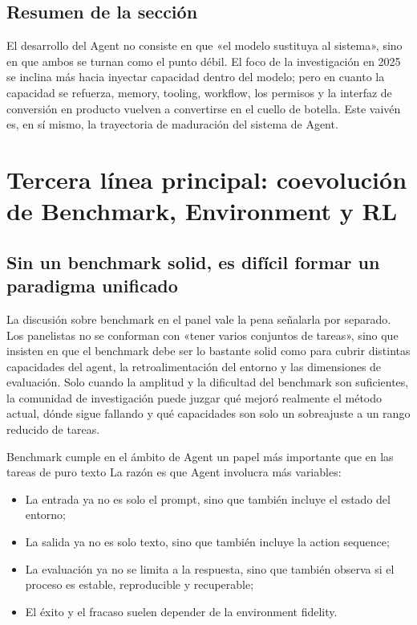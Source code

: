 \documentclass[a4paper]{article}
\begin{document}
\subsection{Resumen de la sección}
El desarrollo del Agent no consiste en que «el modelo sustituya al sistema», sino en que ambos se turnan como el punto débil. El foco de la investigación en 2025 se inclina más hacia inyectar capacidad dentro del modelo; pero en cuanto la capacidad se refuerza, memory, tooling, workflow, los permisos y la interfaz de conversión en producto vuelven a convertirse en el cuello de botella. Este vaivén es, en sí mismo, la trayectoria de maduración del sistema de Agent.

\section{Tercera línea principal: coevolución de Benchmark, Environment y RL}

\subsection{Sin un benchmark solid, es difícil formar un paradigma unificado}
La discusión sobre benchmark en el panel vale la pena señalarla por separado. Los panelistas no se conforman con «tener varios conjuntos de tareas», sino que insisten en que el benchmark debe ser lo bastante solid como para cubrir distintas capacidades del agent, la retroalimentación del entorno y las dimensiones de evaluación. Solo cuando la amplitud y la dificultad del benchmark son suficientes, la comunidad de investigación puede juzgar qué mejoró realmente el método actual, dónde sigue fallando y qué capacidades son solo un sobreajuste a un rango reducido de tareas.

\begin{importantbox}{Benchmark cumple en el ámbito de Agent un papel más importante que en las tareas de puro texto}
La razón es que Agent involucra más variables:
\begin{itemize}
  \item La entrada ya no es solo el prompt, sino que también incluye el estado del entorno;
  \item La salida ya no es solo texto, sino que también incluye la action sequence;
  \item La evaluación ya no se limita a la respuesta, sino que también observa si el proceso es estable, reproducible y recuperable;
  \item El éxito y el fracaso suelen depender de la environment fidelity.
\end{itemize}
\end{importantbox}
\end{document}
